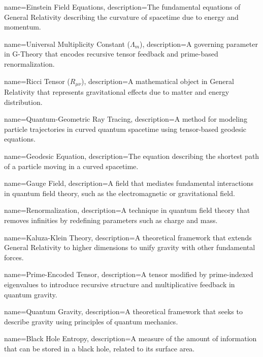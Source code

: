 {
    name={Einstein Field Equations},
    description={The fundamental equations of General Relativity describing the curvature of spacetime due to energy and momentum.}
}

{
    name={Universal Multiplicity Constant (\(\Lambda_m\))},
    description={A governing parameter in G-Theory that encodes recursive tensor feedback and prime-based renormalization.}
}

{
    name={Ricci Tensor (\(R_{\mu\nu}\))},
    description={A mathematical object in General Relativity that represents gravitational effects due to matter and energy distribution.}
}

{
    name={Quantum-Geometric Ray Tracing},
    description={A method for modeling particle trajectories in curved quantum spacetime using tensor-based geodesic equations.}
}

{
    name={Geodesic Equation},
    description={The equation describing the shortest path of a particle moving in a curved spacetime.}
}

{
    name={Gauge Field},
    description={A field that mediates fundamental interactions in quantum field theory, such as the electromagnetic or gravitational field.}
}

{
    name={Renormalization},
    description={A technique in quantum field theory that removes infinities by redefining parameters such as charge and mass.}
}

{
    name={Kaluza-Klein Theory},
    description={A theoretical framework that extends General Relativity to higher dimensions to unify gravity with other fundamental forces.}
}

{
    name={Prime-Encoded Tensor},
    description={A tensor modified by prime-indexed eigenvalues to introduce recursive structure and multiplicative feedback in quantum gravity.}
}

{
    name={Quantum Gravity},
    description={A theoretical framework that seeks to describe gravity using principles of quantum mechanics.}
}

{
    name={Black Hole Entropy},
    description={A measure of the amount of information that can be stored in a black hole, related to its surface area.}
}

